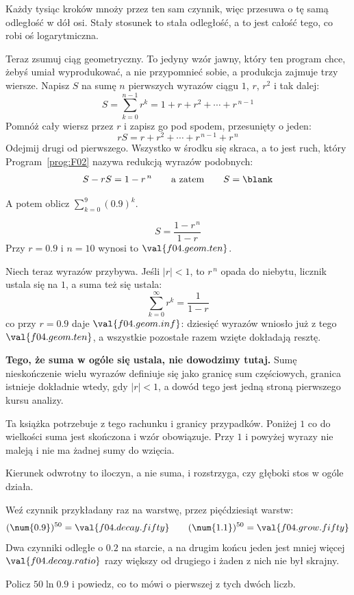 \begin{fr}
Każdy tysiąc kroków mnoży przez ten sam czynnik, więc przesuwa o tę samą
odległość w dół osi. Stały stosunek to stała odległość, a to jest całość tego,
co robi oś logarytmiczna.

Teraz zsumuj ciąg geometryczny. To jedyny wzór jawny, który ten program chce,
żebyś umiał wyprodukować, a nie przypomnieć sobie, a produkcja zajmuje trzy
wiersze. Napisz $S$ na sumę $n$ pierwszych wyrazów ciągu $1$, $r$, $r^{2}$ i
tak dalej:
\[ S = \sum_{k=0}^{n-1} r^{k} = 1 + r + r^{2} + \cdots + r^{\,n-1} \]
Pomnóż cały wiersz przez $r$ i zapisz go pod spodem, przesunięty o jeden:
\[ rS = r + r^{2} + \cdots + r^{\,n-1} + r^{\,n} \]
Odejmij drugi od pierwszego. Wszystko w środku się skraca, a to jest ruch,
który Program~\ref{prog:F02} nazywa redukcją wyrazów podobnych:
\[ S - rS = 1 - r^{\,n} \qquad\text{a zatem}\qquad S = \blank \]

A potem oblicz $\sum_{k=0}^{9} (\num{0.9})^{k}$.
\dotline
\nextframe
\end{fr}

\begin{fr}
\begin{ansblock}
\[ S = \frac{1 - r^{\,n}}{1 - r} \]
Przy $r = \num{0.9}$ i $n = 10$ wynosi to $\val{f04.geom.ten}$.
\end{ansblock}

Niech teraz wyrazów przybywa. Jeśli $\lvert r \rvert < 1$, to $r^{\,n}$ opada
do niebytu, licznik ustala się na $1$, a suma też się ustala:
\[ \sum_{k=0}^{\infty} r^{k} = \frac{1}{1-r} \]
co przy $r = \num{0.9}$ daje $\val{f04.geom.inf}$: dziesięć wyrazów wniosło
już z tego $\val{f04.geom.ten}$, a wszystkie pozostałe razem wzięte dokładają
resztę.

\begin{rigourbox}
\textbf{Tego, że suma w ogóle się ustala, nie dowodzimy tutaj.} Sumę
nieskończenie wielu wyrazów definiuje się jako granicę sum częściowych,
granica istnieje dokładnie wtedy, gdy $\lvert r \rvert < 1$, a dowód tego jest
jedną stroną pierwszego kursu analizy.

Ta książka potrzebuje z tego rachunku i granicy przypadków. Poniżej $1$ co do
wielkości suma jest skończona i wzór obowiązuje. Przy $1$ i powyżej wyrazy nie
maleją i nie ma żadnej sumy do wzięcia.
\end{rigourbox}
\end{fr}

\begin{fr}
Kierunek odwrotny to iloczyn, a nie suma, i rozstrzyga, czy głęboki stos w
ogóle działa.

Weź czynnik przykładany raz na warstwę, przez pięćdziesiąt warstw:
\[ (\num{0.9})^{50} = \val{f04.decay.fifty} \qquad
   (\num{1.1})^{50} = \val{f04.grow.fifty} \]
Dwa czynniki odległe o $\num{0.2}$ na starcie, a na drugim końcu jeden jest
mniej więcej $\val{f04.decay.ratio}$ razy większy od drugiego \dash{} i żaden z
nich nie był skrajny.

\yourturn
Policz $50 \ln \num{0.9}$ i powiedz, co to mówi o pierwszej z tych dwóch
liczb.
\dotline
\nextframe
\end{fr}


